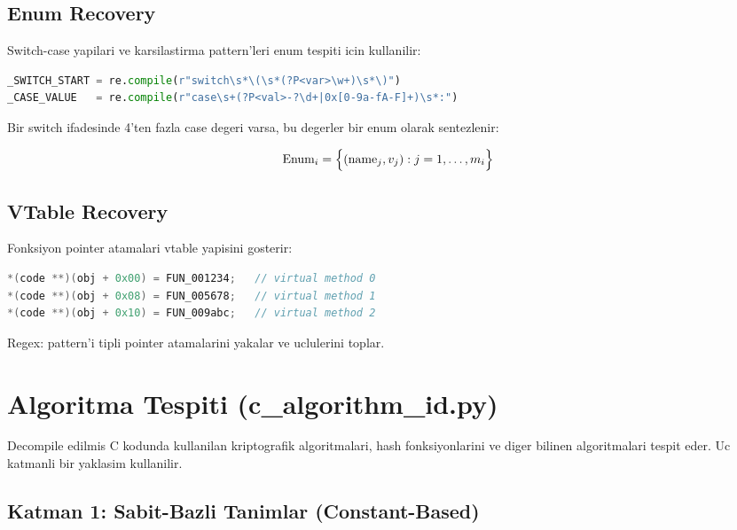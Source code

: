 \subsection{Enum Recovery}

Switch-case yapilari ve karsilastirma pattern'leri enum tespiti icin kullanilir:

\begin{lstlisting}[language=Python, caption={Switch/case regex pattern'leri}]
_SWITCH_START = re.compile(r"switch\s*\(\s*(?P<var>\w+)\s*\)")
_CASE_VALUE   = re.compile(r"case\s+(?P<val>-?\d+|0x[0-9a-fA-F]+)\s*:")
\end{lstlisting}

Bir switch ifadesinde 4'ten fazla case degeri varsa, bu degerler bir
enum olarak sentezlenir:

\begin{equation}
  \text{Enum}_i = \Bigl\{ (\text{name}_j, v_j) : j = 1, \ldots, m_i \Bigr\}
  \label{eq:enum-synth}
\end{equation}

\subsection{VTable Recovery}

Fonksiyon pointer atamalari vtable yapisini gosterir:
\begin{lstlisting}[language=C]
*(code **)(obj + 0x00) = FUN_001234;   // virtual method 0
*(code **)(obj + 0x08) = FUN_005678;   // virtual method 1
*(code **)(obj + 0x10) = FUN_009abc;   // virtual method 2
\end{lstlisting}

Regex:  pattern'i  tipli pointer
atamalari\-ni yakalar ve  uclulerini toplar.


\section{Algoritma Tespiti (c\_algorithm\_id.py)}
\label{sec:algorithm-id}

Decompile edilmis C kodunda kullanilan kriptografik algoritmalari, hash
fonksiyonlarini ve diger bilinen algoritmalari tespit eder.
Uc katmanli bir yaklasim kullanilir.

\subsection{Katman 1: Sabit-Bazli Tanimlar (Constant-Based)}


